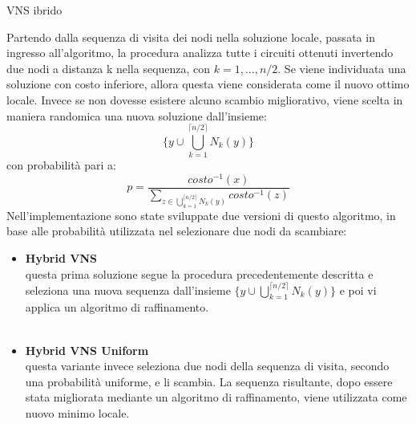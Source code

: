 \begin{algorithm}[h]
\DontPrintSemicolon
{}
\BlankLine
{}
 \caption{VNS ibrido}\label{VNS}
\end{algorithm}
Partendo dalla sequenza di visita dei nodi nella soluzione locale, passata in ingresso all'algoritmo, la procedura analizza tutte i circuiti ottenuti invertendo due nodi a distanza k nella sequenza, con $k=1,...,n/2$. Se viene individuata una soluzione con costo inferiore, allora questa viene considerata come il nuovo ottimo locale. Invece se non dovesse esistere alcuno scambio migliorativo, viene scelta in maniera randomica una nuova soluzione dall'insieme:
$$\biggl\{{y}\cup \bigcup_{k=1}^{\lceil n/2 \rceil}{N_k(y)}\biggr\}$$
con probabilità pari a:
$$p=\frac{costo^{-1}(x)}{\underset{z \in {\bigcup_{k=1}^{\lceil n/2 \rceil}{N_k(y)}}}\sum{costo^{-1}(z)}}$$
Nell'implementazione sono state sviluppate due versioni di questo algoritmo, in base alle probabilità utilizzata nel selezionare due nodi da scambiare: 
\begin{itemize}
\item{\textbf{Hybrid VNS}\\
questa prima soluzione segue la procedura precedentemente descritta e seleziona una nuova sequenza dall'insieme $\{{y}\cup \bigcup_{k=1}^{\lceil n/2 \rceil}{N_k(y)}\}$ e poi vi applica un algoritmo di raffinamento.\\\\} 
\item{\textbf{Hybrid VNS Uniform}\\
questa variante invece seleziona due nodi della sequenza di visita, secondo una probabilità uniforme, e li scambia. La sequenza risultante, dopo essere stata migliorata mediante un algoritmo di raffinamento, viene utilizzata come nuovo minimo locale.}
\end{itemize}
